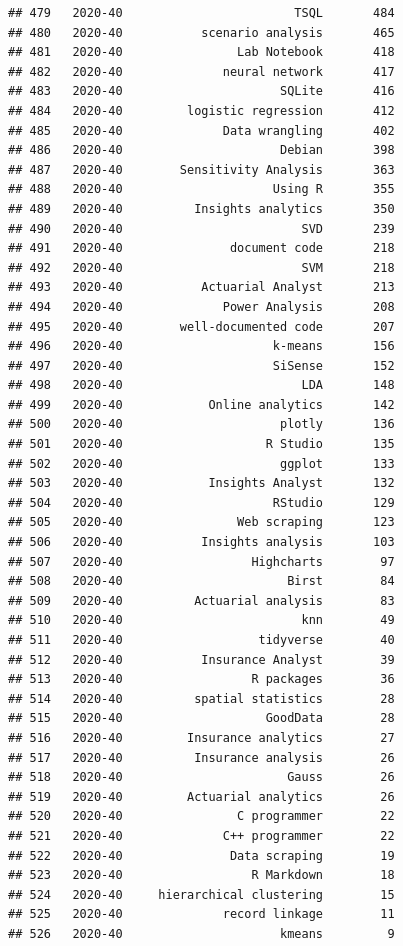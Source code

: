 \documentclass[
]{article}
\begin{document}
\begin{verbatim}
## 479   2020-40                        TSQL       484
## 480   2020-40           scenario analysis       465
## 481   2020-40                Lab Notebook       418
## 482   2020-40              neural network       417
## 483   2020-40                      SQLite       416
## 484   2020-40         logistic regression       412
## 485   2020-40              Data wrangling       402
## 486   2020-40                      Debian       398
## 487   2020-40        Sensitivity Analysis       363
## 488   2020-40                     Using R       355
## 489   2020-40          Insights analytics       350
## 490   2020-40                         SVD       239
## 491   2020-40               document code       218
## 492   2020-40                         SVM       218
## 493   2020-40           Actuarial Analyst       213
## 494   2020-40              Power Analysis       208
## 495   2020-40        well-documented code       207
## 496   2020-40                     k-means       156
## 497   2020-40                     SiSense       152
## 498   2020-40                         LDA       148
## 499   2020-40            Online analytics       142
## 500   2020-40                      plotly       136
## 501   2020-40                    R Studio       135
## 502   2020-40                      ggplot       133
## 503   2020-40            Insights Analyst       132
## 504   2020-40                     RStudio       129
## 505   2020-40                Web scraping       123
## 506   2020-40           Insights analysis       103
## 507   2020-40                  Highcharts        97
## 508   2020-40                       Birst        84
## 509   2020-40          Actuarial analysis        83
## 510   2020-40                         knn        49
## 511   2020-40                   tidyverse        40
## 512   2020-40           Insurance Analyst        39
## 513   2020-40                  R packages        36
## 514   2020-40          spatial statistics        28
## 515   2020-40                    GoodData        28
## 516   2020-40         Insurance analytics        27
## 517   2020-40          Insurance analysis        26
## 518   2020-40                       Gauss        26
## 519   2020-40         Actuarial analytics        26
## 520   2020-40                C programmer        22
## 521   2020-40              C++ programmer        22
## 522   2020-40               Data scraping        19
## 523   2020-40                  R Markdown        18
## 524   2020-40     hierarchical clustering        15
## 525   2020-40              record linkage        11
## 526   2020-40                      kmeans         9

\end{verbatim}
\end{document}
